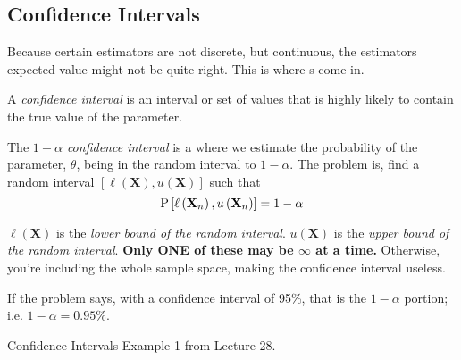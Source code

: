 	\subsection{Confidence Intervals} \label{subsec:Confidence Interval}
	Because certain estimators are not discrete, but continuous, the estimators expected value might not be quite right.
	This is where s come in.
		\begin{definition} \label{def:Confidence Interval}
			A \emph{confidence interval} is an interval or set of values that is highly likely to contain the true value of the parameter.
		\end{definition}
		\begin{definition} \label{def:1-alpha Confidence Interval}
			The \emph{$1-\alpha$ confidence interval} is a  where we estimate the probability of the parameter, $\theta$, being in the random interval to $1-\alpha$.
			The problem is, find a random interval $\left[ \ell \left( \mathbf{X} \right), u \left( \mathbf{X} \right) \right]$ such that
			\begin{equation} \label{eq:1-alpha Confidence Interval}
				\operatorname{\operatorname{P}} \left[ \ell \left( \mathbf{X}_{n} \right) , u \left( \mathbf{X}_{n} \right) \right] = 1-\alpha
			\end{equation}
			\begin{remark}
				$\ell \left( \mathbf{X} \right)$ is the \emph{lower bound of the random interval}.
				$u \left( \mathbf{X} \right)$ is the \emph{upper bound of the random interval}.
				\textbf{Only ONE of these may be $\infty$ at a time.} Otherwise, you're including the whole sample space, making the confidence interval useless.
			\end{remark}
			\begin{remark}
				If the problem says, with a confidence interval of 95\%, that is the $1-\alpha$ portion; i.e. $1-\alpha = 0.95 \%$.
			\end{remark}
		\end{definition}
		\begin{example}{Confidence Intervals}
			Example 1 from Lecture 28.
		\end{example}
	

